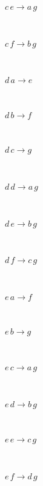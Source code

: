 \documentclass[rep10,leqno]{report}
\begin{document}
\begin{minipage}{6in}
$
c\,
 e\rightarrow a\,
 g
$
\end{minipage}\medskip \\
\begin{minipage}{6in}
$
c\,
 f\rightarrow b\,
 g
$
\end{minipage}\medskip \\
\begin{minipage}{6in}
$
d\,
 a\rightarrow e
$
\end{minipage}\medskip \\
\begin{minipage}{6in}
$
d\,
 b\rightarrow f
$
\end{minipage}\medskip \\
\begin{minipage}{6in}
$
d\,
 c\rightarrow g
$
\end{minipage}\medskip \\
\begin{minipage}{6in}
$
d\,
 d\rightarrow a\,
 g
$
\end{minipage}\medskip \\
\begin{minipage}{6in}
$
d\,
 e\rightarrow b\,
 g
$
\end{minipage}\medskip \\
\begin{minipage}{6in}
$
d\,
 f\rightarrow c\,
 g
$
\end{minipage}\medskip \\
\begin{minipage}{6in}
$
e\,
 a\rightarrow f
$
\end{minipage}\medskip \\
\begin{minipage}{6in}
$
e\,
 b\rightarrow g
$
\end{minipage}\medskip \\
\begin{minipage}{6in}
$
e\,
 c\rightarrow a\,
 g
$
\end{minipage}\medskip \\
\begin{minipage}{6in}
$
e\,
 d\rightarrow b\,
 g
$
\end{minipage}\medskip \\
\begin{minipage}{6in}
$
e\,
 e\rightarrow c\,
 g
$
\end{minipage}\medskip \\
\begin{minipage}{6in}
$
e\,
 f\rightarrow d\,
 g
$
\end{minipage}\medskip \\
\end{document}
